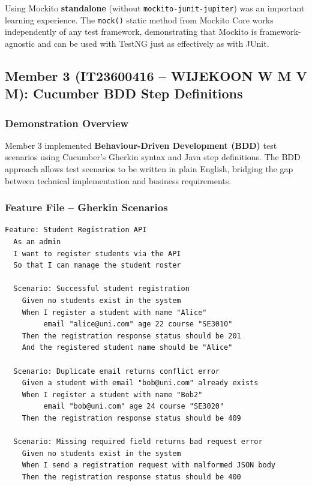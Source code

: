\documentclass[12pt,a4paper]{article}
\begin{document}
Using Mockito \textbf{standalone} (without \texttt{mockito-junit-jupiter}) was an important learning experience. The \texttt{mock()} static method from Mockito Core works independently of any test framework, demonstrating that Mockito is framework-agnostic and can be used with TestNG just as effectively as with JUnit.

\subsection{Member 3 (IT23600416 -- WIJEKOON W M V M): Cucumber BDD Step Definitions}

\subsubsection{Demonstration Overview}

Member 3 implemented \textbf{Behaviour-Driven Development (BDD)} test scenarios using Cucumber's Gherkin syntax and Java step definitions. The BDD approach allows test scenarios to be written in plain English, bridging the gap between technical implementation and business requirements.

\subsubsection{Feature File -- Gherkin Scenarios}

\begin{lstlisting}[style=gherkinstyle, caption={BDD scenarios in Gherkin -- \texttt{student\_registration.feature}}]
Feature: Student Registration API
  As an admin
  I want to register students via the API
  So that I can manage the student roster

  Scenario: Successful student registration
    Given no students exist in the system
    When I register a student with name "Alice"
         email "alice@uni.com" age 22 course "SE3010"
    Then the registration response status should be 201
    And the registered student name should be "Alice"

  Scenario: Duplicate email returns conflict error
    Given a student with email "bob@uni.com" already exists
    When I register a student with name "Bob2"
         email "bob@uni.com" age 24 course "SE3020"
    Then the registration response status should be 409

  Scenario: Missing required field returns bad request error
    Given no students exist in the system
    When I send a registration request with malformed JSON body
    Then the registration response status should be 400
\end{lstlisting}
\end{document}
